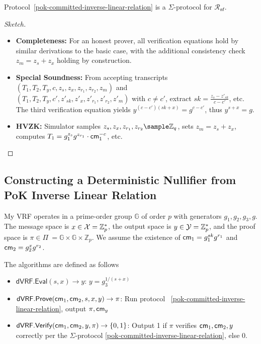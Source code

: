 \begin{theorem}
Protocol~\ref{pok-committed-inverse-linear-relation} is a $\Sigma$-protocol for $\mathcal{R}_{\mathsf{nf}}$.
\end{theorem}

\begin{proof}[Sketch]
\begin{itemize}
    \item \textbf{Completeness:} For an honest prover, all verification equations hold by similar derivations to the basic case, with the additional consistency check $z_m = z_{s} + z_x$ holding by construction.
    
    \item \textbf{Special Soundness:} From accepting transcripts $(T_1, T_2, T_y, c, z_{s}, z_x, z_{r_1}, z_{r_2}, z_m)$ and \\ $(T_1, T_2, T_y, c', z'_{sk}, z'_x, z'_{r_1}, z'_{r_2}, z'_m)$ with $c \neq c'$, extract $sk = \frac{z_{s} - z'_{sk}}{c - c'}$, etc. The third verification equation yields $y^{(c - c')(sk + x)} = g^{c - c'}$, thus $y^{s+x} = g$.

    \item \textbf{HVZK:} Simulator samples $z_{s}, z_x, z_{r_1}, z_{r_2} \sample \mathbb{Z}_q$, sets $z_m = z_{s} + z_x$, computes $T_1 = g_1^{z_{s}}g^{z_{r_1}} \cdot \mathsf{cm}_1^{-c}$, etc.
\end{itemize}
\end{proof}








\subsection{Constructing a Deterministic Nullifier from PoK Inverse Linear Relation}
\label{subsec:deterministic-nullifier}

My VRF operates in a prime-order group $\mathbb{G}$ of order $p$ with generators $g_1, g_2, g_3, g$. The message space is $ x \in \mathcal{X} = \mathbb{Z}_p^*$, the output space is $y \in \mathcal{Y} = \mathbb{Z}_p^*$, and the proof space is $\pi \in \Pi\ = \mathbb{G} \times \mathbb{G} \times \mathbb{Z}_p$. We assume the existence of $\mathsf{cm}_1 = g_1^{sk} g^{r_1}$ and $\mathsf{cm}_2 = g_2^{x} g^{r_2}$.

The algorithms are defined as follows

\begin{itemize}
    \item $\mathsf{dVRF.Eval}(s, x) \to y$: $y = g_3^{1/(s+x)}$
    
    \item $\mathsf{dVRF.Prove}(\mathsf{cm}_1, \mathsf{cm}_2, s, x, y) \to \pi$: Run protocol ~\ref{pok-committed-inverse-linear-relation}, output $\pi, \mathsf{cm}_y$
    
    \item $\mathsf{dVRF.Verify}(\mathsf{cm}_1, \mathsf{cm}_2, y, \pi) \to \{0,1\}$: Output 1 if $\pi$ verifies $\mathsf{cm}_1, \mathsf{cm}_2, y$ correctly per the $\Sigma$-protocol \ref{pok-committed-inverse-linear-relation}, else 0.
\end{itemize}




